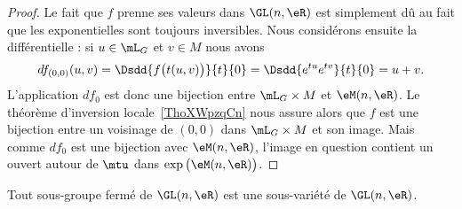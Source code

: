 \begin{proof}
	Le fait que \( f\) prenne ses valeurs dans \( \GL(n,\eR)\) est simplement dû au fait que les exponentielles sont toujours inversibles. Nous considérons ensuite la différentielle : si \( u\in \mL_G\) et \( v\in M\) nous avons
	\begin{equation}
		df_{(0,0)}(u,v)=\Dsdd{ f\big( t(u,v) \big) }{t}{0}=\Dsdd{  e^{tu} e^{tv} }{t}{0}=u+v.
	\end{equation}
	L'application \( df_0\) est donc une bijection entre \( \mL_G\times M\) et \( \eM(n,\eR)\). Le théorème d'inversion locale~\ref{ThoXWpzqCn} nous assure alors que \( f\) est une bijection entre un voisinage de \( (0,0)\) dans \( \mL_G\times M\) et son image. Mais comme \( df_0\) est une bijection avec \( \eM(n,\eR)\), l'image en question contient un ouvert autour de \( \mtu\) dans \( \exp\big( \eM(n,\eR) \big)\).
\end{proof}

\begin{theorem}         \label{ThoOBriEoe}
	Tout sous-groupe fermé de \( \GL(n,\eR)\) est une sous-variété de \( \GL(n,\eR)\).
\end{theorem}

